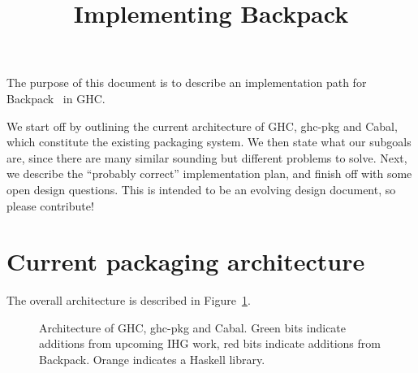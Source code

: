 \documentclass{article}
\title{Implementing Backpack}
\begin{document}
\maketitle

The purpose of this document is to describe an implementation path
for Backpack~\cite{Kilpatrick:2014:BRH:2535838.2535884} in GHC\@.

We start off by outlining the current architecture of GHC, ghc-pkg and Cabal,
which constitute the existing packaging system.  We then state what our subgoals
are, since there are many similar sounding but different problems to solve.  Next,
we describe the ``probably correct'' implementation plan, and finish off with
some open design questions.  This is intended to be an evolving design document,
so please contribute!

\section{Current packaging architecture}

The overall architecture is described in Figure~\ref{fig:arch}.

\begin{figure}[H]
\label{fig:arch}\caption{Architecture of GHC, ghc-pkg and Cabal. Green bits indicate additions from upcoming IHG work, red bits indicate additions from Backpack.  Orange indicates a Haskell library.}
\end{figure}
\end{document}
